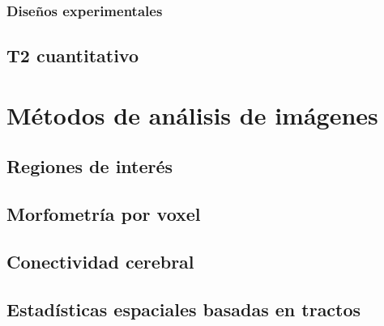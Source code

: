 \documentclass[]{memoir}          %
\begin{document}
\section{Diseños experimentales}


\chapter{T2 cuantitativo}
\label{chapter_T2}









\part{Métodos de análisis de imágenes}
\label{part_metodos}


\chapter{Regiones de interés}
\label{chapter_roi}

\chapter{Morfometría por voxel}
\label{chapter_vbm}

\chapter{Conectividad cerebral}
\label{chapter_conectividad}


\chapter{Estadísticas espaciales basadas en tractos}
\label{chapter_tbss}
\end{document}
